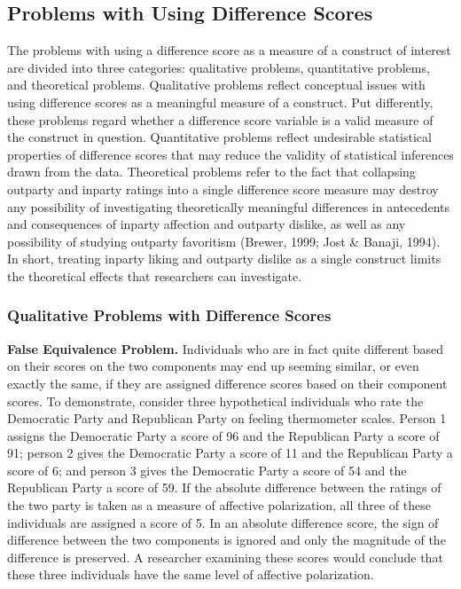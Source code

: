 \documentclass[authordate, meta, issue]{jote-new-article}
\begin{document}
	\subsection{Problems with Using Difference Scores}



	The problems with using a difference score as a measure of a construct of interest are divided into three categories: qualitative problems, quantitative problems, and theoretical problems. Qualitative problems reflect conceptual issues with using difference scores as a meaningful measure of a construct. Put differently, these problems regard whether a difference score variable is a valid measure of the construct in question. Quantitative problems reflect undesirable statistical properties of difference scores that may reduce the validity of statistical inferences drawn from the data. Theoretical problems refer to the fact that collapsing outparty and inparty ratings into a single difference score measure may destroy any possibility of investigating theoretically meaningful differences in antecedents and consequences of inparty affection and outparty dislike, as well as any possibility of studying outparty favoritism (Brewer, 1999; Jost \& Banaji, 1994). In short, treating inparty liking and outparty dislike as a single construct limits the theoretical effects that researchers can investigate.



	\subsubsection{Qualitative Problems with Difference Scores}



	\textbf{False Equivalence Problem. }Individuals who are in fact quite different based on their scores on the two components may end up seeming similar, or even exactly the same, if they are assigned difference scores based on their component scores. To demonstrate, consider three hypothetical individuals who rate the Democratic Party and Republican Party on feeling thermometer scales. Person 1 assigns the Democratic Party a score of 96 and the Republican Party a score of 91; person 2 gives the Democratic Party a score of 11 and the Republican Party a score of 6; and person 3 gives the Democratic Party a score of 54 and the Republican Party a score of 59. If the absolute difference between the ratings of the two party is taken as a measure of affective polarization, all three of these individuals are assigned a score of 5. In an absolute difference score, the sign of difference between the two components is ignored and only the magnitude of the difference is preserved. A researcher examining these scores would conclude that these three individuals have the same level of affective polarization.
\end{document}
